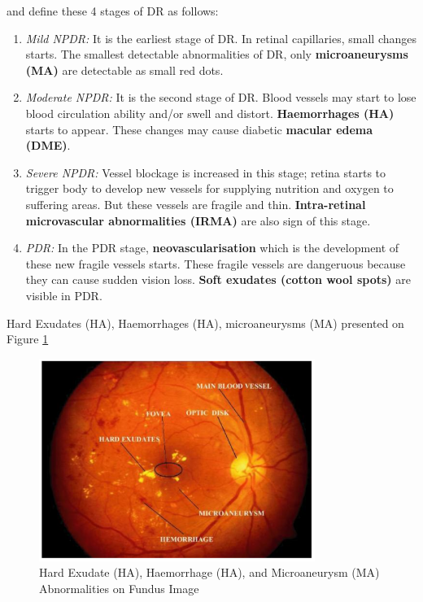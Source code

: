 \citet{NationalEyeInstitute} and \citet{wilkinson2003proposed} define these 4 stages of DR as follows:
\begin{enumerate}
        \item \textit{Mild NPDR:} It is the earliest stage of DR. In retinal capillaries, small changes starts. The smallest detectable abnormalities of DR, only \textbf{microaneurysms (MA)} are detectable as small red dots.
        \item \textit{Moderate NPDR:} It is the second stage of DR. Blood vessels may start to lose blood circulation ability and/or swell and distort. \textbf{Haemorrhages (HA)} starts to appear. These changes may cause diabetic \textbf{macular edema (DME)}.  
        \item \textit{Severe NPDR:} Vessel blockage is increased in this stage; retina starts to trigger body to develop new vessels for supplying nutrition and oxygen to suffering areas. But these vessels are fragile and thin. \textbf{Intra-retinal microvascular abnormalities (IRMA)} are also sign of this stage. 
        \item \textit{PDR:} In the PDR stage, \textbf{neovascularisation} which is the development of these new fragile vessels starts. These fragile vessels  are dangeruous because they can cause sudden vision loss. \textbf{Soft exudates (cotton wool spots)} are visible in PDR. 
\end{enumerate}


Hard Exudates (HA), Haemorrhages (HA), microaneurysms (MA) presented on Figure \ref{AbnormalitiesFundusImage}

\begin{figure}[t]
\centering
\includegraphics[width=0.8\textwidth]{Figures/retina_abnormalities}
\caption{Hard Exudate (HA), Haemorrhage (HA), and Microaneurysm (MA) Abnormalities on Fundus Image \citep[from][]{kekre2013hybrid}}
\label{AbnormalitiesFundusImage}
\end{figure}

